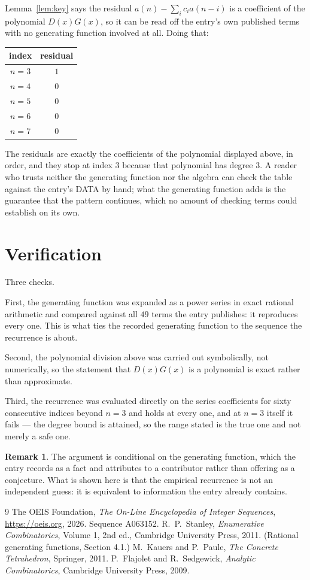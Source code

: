 \documentclass[11pt,a4paper]{article}
\theoremstyle{plain}
\theoremstyle{definition}
\newtheorem{remark}[theorem]{Remark}
\begin{document}
Lemma~\ref{lem:key} says the residual $a(n)-\sum_ic_ia(n-i)$ is a coefficient of the
polynomial $D(x)G(x)$, so it can be read off the entry's own published terms with no
generating function involved at all. Doing that:
\begin{center}
\begin{tabular}{cc}
index & residual \\ \hline
$n=3$ & $1$ \\
$n=4$ & $0$ \\
$n=5$ & $0$ \\
$n=6$ & $0$ \\
$n=7$ & $0$
\end{tabular}
\end{center}
The residuals are exactly the coefficients of the polynomial displayed above, in order, and
they stop at index $3$ because that polynomial has degree $3$. A reader who trusts
neither the generating function nor the algebra can check the table against the entry's DATA
by hand; what the generating function adds is the guarantee that the pattern continues, which
no amount of checking terms could establish on its own.

\section{Verification}

Three checks.

First, the generating function was expanded as a power series in exact rational arithmetic and
compared against all $49$ terms the entry publishes: it reproduces every one. This is
what ties the recorded generating function to the sequence the recurrence is about.

Second, the polynomial division above was carried out symbolically, not numerically, so the
statement that $D(x)G(x)$ is a polynomial is exact rather than approximate.

Third, the recurrence was evaluated directly on the series coefficients for sixty consecutive
indices beyond $n=3$ and holds at every one, and at $n=3$ itself it fails --- the
degree bound is attained, so the range stated is the true one and not merely a safe one.

\begin{remark}
The argument is conditional on the generating function, which the entry records as a fact and
attributes to a contributor rather than offering as a conjecture. What is shown here is that
the empirical recurrence is not an independent guess: it is equivalent to information the
entry already contains.
\end{remark}

\begin{thebibliography}{9}
 The OEIS Foundation, \emph{The On-Line Encyclopedia of Integer
Sequences}, \url{https://oeis.org}, 2026. Sequence A063152.
 R.~P.~Stanley, \emph{Enumerative Combinatorics}, Volume 1, 2nd ed.,
Cambridge University Press, 2011. (Rational generating functions, Section 4.1.)
 M.~Kauers and P.~Paule, \emph{The Concrete Tetrahedron}, Springer, 2011.
 P.~Flajolet and R.~Sedgewick, \emph{Analytic Combinatorics}, Cambridge
University Press, 2009.
\end{thebibliography}
\end{document}
